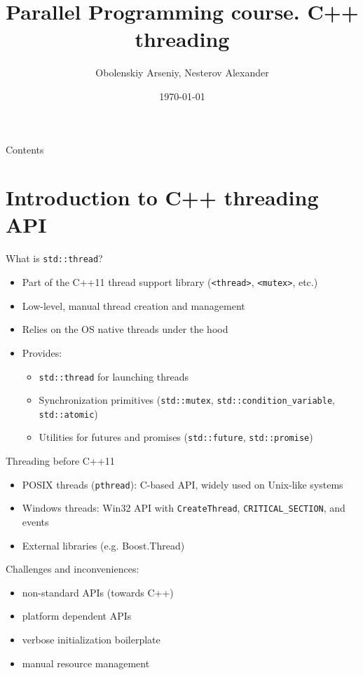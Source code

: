 \documentclass{beamer}
\title[Parallel Programming. C++ threading]{Parallel Programming course. C++ threading}
\author{Obolenskiy Arseniy, Nesterov Alexander}
\institute{Nizhny Novgorod State University}
\date{\today} %
\begin{document}
\begin{frame}
  \titlepage
\end{frame}

\begin{frame}{Contents}
  \tableofcontents
\end{frame}

\section{Introduction to C++ threading API}

\begin{frame}{What is \texttt{std::thread}?}
  \begin{itemize}
    \item Part of the C++11 thread support library (\texttt{<thread>}, \texttt{<mutex>}, etc.)
    \item Low-level, manual thread creation and management
    \item Relies on the OS native threads under the hood
    \item Provides:
      \begin{itemize}
        \item \texttt{std::thread} for launching threads
        \item Synchronization primitives (\texttt{std::mutex}, \texttt{std::condition\_variable}, \texttt{std::atomic})
        \item Utilities for futures and promises (\texttt{std::future}, \texttt{std::promise})
      \end{itemize}
  \end{itemize}
\end{frame}

\begin{frame}{Threading before C++11}
  \begin{itemize}
    \item POSIX threads (\texttt{pthread}): C-based API, widely used on Unix-like systems
    \item Windows threads: Win32 API with \texttt{CreateThread}, \texttt{CRITICAL\_SECTION}, and events
    \item External libraries (e.g. Boost.Thread)
  \end{itemize}
  Challenges and inconveniences:
  \begin{itemize}
    \item non-standard APIs (towards C++)
    \item platform dependent APIs
    \item verbose initialization boilerplate
    \item manual resource management
  \end{itemize}
\end{frame}
\end{document}
